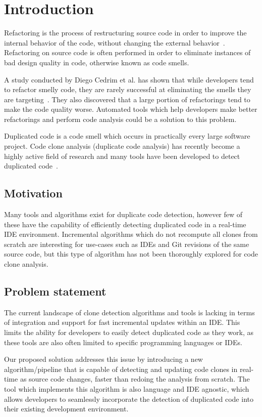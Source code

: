 \chapter{Introduction}

Refactoring is the process of restructuring source code in order to improve the internal behavior
of the code, without changing the external behavior~\cite[9]{fowlerrefactoring}.
Refactoring on source code is often performed in order to eliminate instances of bad
design quality in code, otherwise known as code smells.

A study conducted by Diego Cedrim et al. has shown that while developers tend to refactor
smelly code, they are rarely successful at eliminating the smells they are
targeting~\cite{Rohit_Gheyi_Impact}. They also discovered that a large portion of
refactorings tend to make the code quality worse. Automated tools which help developers
make better refactorings and perform code analysis could be a solution to this problem.

Duplicated code is a code smell which occurs in practically every large software project.
Code clone analysis (duplicate code analysis) has recently become a highly active field
of research and many tools have been developed to detect duplicated
code~\cite[7]{Inoue_introduction_to_cc}. 

\section{Motivation}

Many tools and algorithms exist for duplicate code detection, however few of these have
the capability of efficiently detecting duplicated code in a real-time IDE environment.
Incremental algorithms which do not recompute all clones from scratch are interesting for
use-cases such as IDEs and Git revisions of the same source code, but this type of
algorithm has not been thoroughly explored for code clone analysis.

\section{Problem statement}

The current landscape of clone detection algorithms and tools is lacking in terms of
integration and support for fast incremental updates within an IDE. This limits the
ability for developers to easily detect duplicated code as they work, as these tools are
also often limited to specific programming languages or IDEs.

Our proposed solution addresses this issue by introducing a new algorithm/pipeline that is
capable of detecting and updating code clones in real-time as source code changes, faster
than redoing the analysis from scratch. The tool which implements this algorithm is also
language and IDE agnostic, which allows developers to seamlessly incorporate the detection
of duplicated code into their existing development environment.
